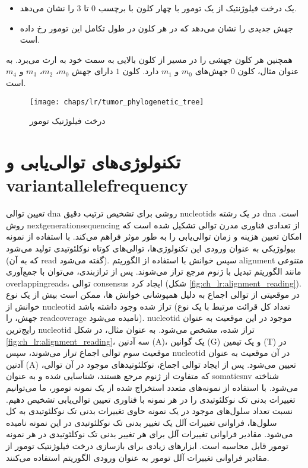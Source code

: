 \begin{itemize}
	\item یک درخت فیلوژنتیک از یک تومور با چهار کلون با برچسب $0$ تا $3$ را نشان می‌دهد.
	\item جهش جدیدی را نشان می‌دهد که در هر کلون در طول تکامل این تومور رخ داده است.
\end{itemize}

 همچنین هر کلون جهشی را در مسیر از کلون بالایی به سمت خود به ارث می‌برد. به عنوان مثال، کلون $0$ جهش‌های
  $m_0$ و	 $m_1$ دارد. کلون $1$ دارای جهش $m_0$، $m_2$، $m_3$ و $m_4$ است.
 
\begin{figure}[!ht]
	\centerline{\texttt{[image: chaps/lr/tumor\_phylogenetic\_tree]}}
	\caption{درخت فیلوژنیک تومور}
	\label{fig:ch_lr:tumor_phylogenetic_tree}
\end{figure}


\section{تکنولوژی‌های توالی‌یابی و \gls{variantallelefrequency}}




تعیین توالی \gls{dna} روشی برای تشخیص ترتیب دقیق \glspl{nucleotid} در یک رشته \gls{dna} است. روش \gls{nextgenerationsequencing}  از تعدادی فناوری مدرن توالی تشکیل شده است که امکان تعیین هزینه و زمان توالی‌یابی را به طور موثر فراهم می‌کند. با استفاده از نمونه بیولوژیکی به عنوان ورودی این تکنولوژی‌ها، توالی‌های کوتاه نوکلئوتیدی تولید می‌شود (که به آن \gls{read}  گفته می‌شود). سپس خوانش با استفاده از الگوریتم \gls{alignment}  متنوعی مانند الگوریتم تبدیل  با ژنوم مرجع تراز می‌شوند. پس از ترازبندی، می‌توان با جمع‌آوری \glspl{overlappingread}،  توالی \gls{consensus}  ایجاد کرد (شکل \ref{fig:ch_lr:alignment_reading}). در موقعیتی از توالی اجماع به دلیل همپوشانی خوانش ها، ممکن است بیش از یک نوع خوانش از \gls{nucleotid} تراز شده وجود داشته باشد (تعداد کل قرائت مرتبط با یک نوع جهش، را \gls{readcoverage}  نامیده می‌شود). \gls{nucleotid} موجود در این موقعیت به عنوان رایج‌ترین \gls{nucleotid} تراز شده، مشخص می‌شود. به عنوان مثال، در شکل \ref{fig:ch_lr:alignment_reading}، سه آدنین (A)، یک گوانین (G) و یک تیمین (T)  در موقعیت سوم توالی اجماع تراز می‌شوند، سپس \gls{nucleotid} در آن موقعیت به عنوان آدنین (A) تعیین می‌شود. پس از ایجاد توالی اجماع، نوکلئوتیدهای موجود در آن توالی، که متفاوت از ژنوم مرجع هستند، شناسایی شده و به عنوان \gls{somaticsnv}  شناخته می‌شود. با استفاده از نمونه‌های متعدد استخراج شده از یک نمونه تومور، ما می‌توانیم تغییرات بدنی تک نوکلئوتیدی را در هر نمونه با فناوری تعیین توالی‌یابی تشخیص دهیم. نسبت تعداد سلول‌های موجود در یک نمونه حاوی تغییرات بدنی تک نوکلئوتیدی به کل سلول‌ها، فراوانی تغییرات آلل یک تغییر بدنی تک نوکلئوتیدی در این نمونه نامیده می‌شود. مقادیر فراوانی تغییرات آلل برای هر تغییر بدنی تک نوکلئوتیدی  در هر نمونه تومور قابل محاسبه است. ابزارهای زیادی برای بازسازی درخت فیلوژنتیک تومور از مقادیر فراوانی تغییرات آلل تومور به عنوان ورودی الگوریتم استفاده می‌کنند.



